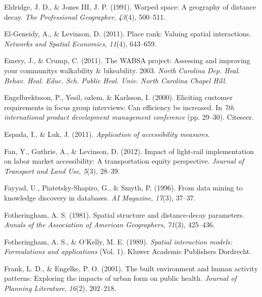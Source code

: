 \documentclass[
11pt, %
oneside, %
english, %
singlespacing, %
]{macthesis} %
\newlength{\cslhangindent}
\newenvironment{CSLReferences}[2] %
 {%
  \setlength{\parindent}{0pt}
  \ifodd #1 \everypar{\setlength{\hangindent}{\cslhangindent}}\ignorespaces\fi
  \ifnum #2 > 0
  \setlength{\parskip}{#2\baselineskip}
  \fi
 }%
 {}
\begin{document}
\begin{CSLReferences}{1}{0}
\leavevmode{}%
Eldridge, J. D., \& Jones III, J. P. (1991). Warped space: A geography of distance decay. \emph{The Professional Geographer}, \emph{43}(4), 500--511.

\leavevmode{}%
El-Geneidy, A., \& Levinson, D. (2011). Place rank: Valuing spatial interactions. \emph{Networks and Spatial Economics}, \emph{11}(4), 643--659.

\leavevmode{}%
Emery, J., \& Crump, C. (2011). The WABSA project: Assessing and improving your communitys walkability \& bikeability. 2003. \emph{North Carolina Dep. Heal. Behav. Heal. Educ. Sch. Public Heal. Univ. North Carolina Chapel Hill}.

\leavevmode{}%
Engelbrektsson, P., Yesil, ozlem, \& Karlsson, I. (2000). Eliciting customer requirements in focus group interviews: Can efficiency be increased. In \emph{7th international product development management conference} (pp. 29--30). Citeseer.

\leavevmode{}%
Espada, I., \& Luk, J. (2011). \emph{Application of accessibility measures}.

\leavevmode{}%
Fan, Y., Guthrie, A., \& Levinson, D. (2012). Impact of light-rail implementation on labor market accessibility: A transportation equity perspective. \emph{Journal of Transport and Land Use}, \emph{5}(3), 28--39.

\leavevmode{}%
Fayyad, U., Piatetsky-Shapiro, G., \& Smyth, P. (1996). From data mining to knowledge discovery in databases. \emph{AI Magazine}, \emph{17}(3), 37--37.

\leavevmode{}%
Fotheringham, A. S. (1981). Spatial structure and distance-decay parameters. \emph{Annals of the Association of American Geographers}, \emph{71}(3), 425--436.

\leavevmode{}%
Fotheringham, A. S., \& O'Kelly, M. E. (1989). \emph{Spatial interaction models: Formulations and applications} (Vol. 1). Kluwer Academic Publishers Dordrecht.

\leavevmode{}%
Frank, L. D., \& Engelke, P. O. (2001). The built environment and human activity patterns: Exploring the impacts of urban form on public health. \emph{Journal of Planning Literature}, \emph{16}(2), 202--218.


\end{CSLReferences}
\end{document}
